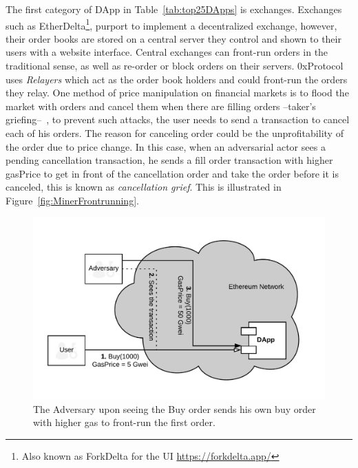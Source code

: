 The first category of DApp in Table~\ref{tab:top25DApps} is exchanges. Exchanges such as EtherDelta\footnote{Also known as ForkDelta for the UI \url{https://forkdelta.app/}}, purport to implement a decentralized exchange, however, their order books are stored on a central server they control and shown to their users with a website interface. Central exchanges can front-run orders in the traditional sense, as well as re-order or block orders on their servers. 0xProtocol~\cite{warren20170x} uses \textit{Relayers} which act as the order book holders and could front-run the orders they relay. One method of price manipulation on financial markets is to flood the market with orders and cancel them when there are filling orders --taker's griefing--~\cite{consesnsys0xReview2017}, to prevent such attacks, the user needs to send a transaction to cancel each of his orders. The reason for canceling order could be the unprofitability of the order due to price change. In this case, when an adversarial actor sees a pending cancellation transaction, he sends a fill order transaction with higher gasPrice to get in front of the cancellation order and take the order before it is canceled, this is known as \textit{cancellation grief}. This is illustrated in Figure~\ref{fig:MinerFrontrunning}.

\begin{figure}[t]
\centering
\includegraphics[width=0.7\linewidth]{figures/Regular_frontrunning.png}
\caption{The Adversary upon seeing the Buy order sends his own buy order with higher gas to front-run the first order. \label{fig:RegularFrontrunning}} 
\end{figure}


